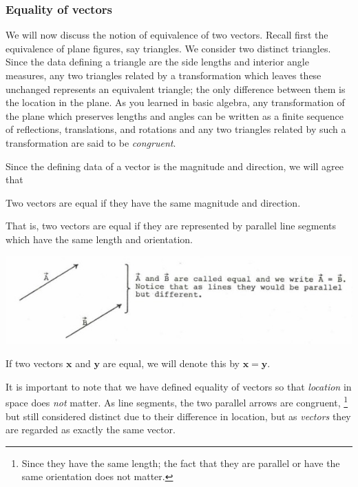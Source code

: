 \documentclass[12pt,letterpaper,reqno]{article}
\numberwithin{equation}{section}
\begin{document}
\subsubsection{Equality of vectors}
We will now discuss the notion of equivalence of two vectors. Recall first the equivalence of plane figures, say triangles. We consider two distinct triangles. Since the data defining a triangle are the side lengths and interior angle measures, any two triangles related by a transformation which leaves these unchanged represents an equivalent triangle; the only difference between them is the location in the plane. As you learned in basic algebra, any transformation of the plane which preserves lengths and angles can be written as a finite sequence of reflections, translations, and rotations and any two triangles related by such a transformation are said to be \emph{congruent}. 

Since the defining data of a vector is the magnitude and direction, we will agree that

\begin{defn}
Two vectors are equal if they have the same magnitude and direction.	
\end{defn}
That is, two vectors are equal if they are represented by parallel line segments which have the same length and orientation. 

\begin{center}
	\includegraphics[scale=0.5]{figures_mvc/equal_vectors_new}
\end{center}
If two vectors $\mathbf{x}$ and $\mathbf{y}$ are equal, we will denote this by $\mathbf{x}=\mathbf{y}$.

It is important to note that we have defined equality of vectors so that \emph{location} in space does \emph{not} matter. As line segments, the two parallel arrows are congruent, \footnote{Since they have the same length; the fact that they are parallel or have the same orientation does not matter.} but still considered distinct due to their difference in location, but as \emph{vectors} they are regarded as exactly the same vector.
\end{document}
